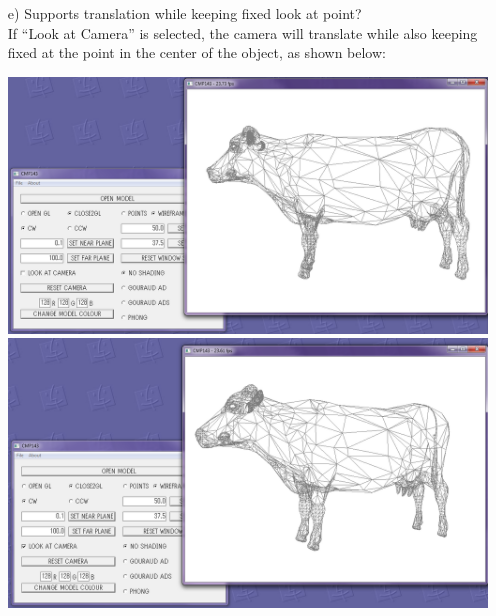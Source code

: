 \documentclass[12pt]{article}
\begin{document}
\begin{itemize}
\begin{itemize}
\item[e)] Supports translation while keeping fixed look at point?\\
If ``Look at Camera'' is selected, the camera will translate while also keeping fixed at the point in the center of the object, as shown below:
\begin{center}
\includegraphics[scale=0.4]{8.png}
\includegraphics[scale=0.4]{10.png}
\end{center}


\end{itemize}
\end{itemize}
\end{document}
